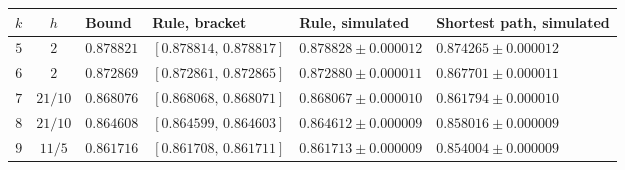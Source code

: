 \begin{tabular}{@{}ccllll@{}}
\toprule
$k$ & $h$ & Bound & Rule, bracket & Rule, simulated & Shortest path, simulated \\
\midrule
$5$ & $2$ & $0.878821$ & $[0.878814,\,0.878817]$ & $0.878828\pm0.000012$ & $0.874265\pm0.000012$ \\
$6$ & $2$ & $0.872869$ & $[0.872861,\,0.872865]$ & $0.872880\pm0.000011$ & $0.867701\pm0.000011$ \\
$7$ & $21/10$ & $0.868076$ & $[0.868068,\,0.868071]$ & $0.868067\pm0.000010$ & $0.861794\pm0.000010$ \\
$8$ & $21/10$ & $0.864608$ & $[0.864599,\,0.864603]$ & $0.864612\pm0.000009$ & $0.858016\pm0.000009$ \\
$9$ & $11/5$ & $0.861716$ & $[0.861708,\,0.861711]$ & $0.861713\pm0.000009$ & $0.854004\pm0.000009$ \\
\bottomrule
\end{tabular}

